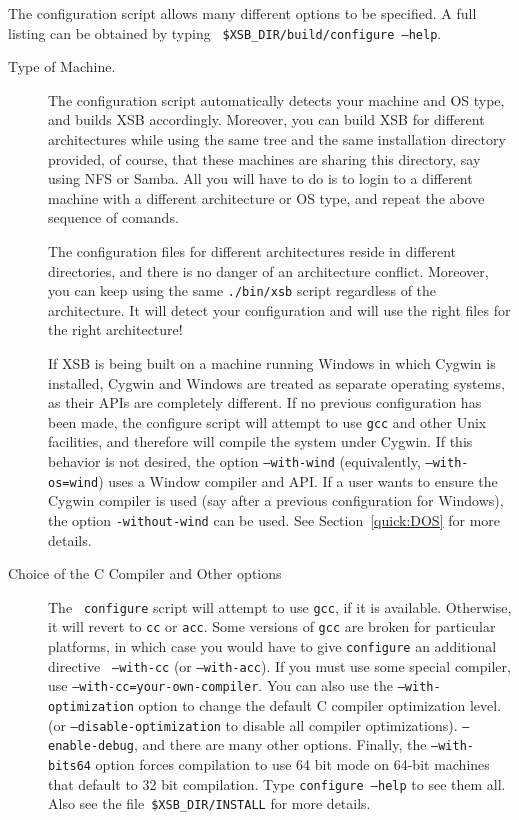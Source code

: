The configuration script allows many different options to be
specified.  A full listing can be obtained by typing {\tt
\$XSB\_DIR/build/configure --help}.
\begin{description}
\item[Type of Machine.]  The configuration script automatically detects
  your machine and OS type, and builds XSB accordingly. Moreover, you can
  build XSB for different architectures while using the same tree and the
  same installation directory provided, of course, that these machines are
  sharing this directory, say using NFS or Samba. All you will have to do
  is to login to a different machine with a different architecture or OS
  type, and repeat the above sequence of comands.
  
  The configuration files for different architectures reside in different
  directories, and there is no danger of an architecture conflict.
  Moreover, you can keep using the same {\tt ./bin/xsb} script regardless
  of the architecture. It will detect your configuration and will use the
  right files for the right architecture! 

  If XSB is being built on a machine running Windows in which Cygwin
  is installed, Cygwin and Windows are treated as separate operating
  systems, as their APIs are completely different.  If no previous
  configuration has been made, the configure script will attempt to
  use {\tt gcc} and other Unix facilities, and therefore will compile
  the system under Cygwin.  If this behavior is not desired, the
  option {\tt --with-wind} (equivalently, {\tt --with-os=wind}) uses a
  Window compiler and API.  If a user wants to ensure the Cygwin
  compiler is used (say after a previous configuration for Windows),
  the option {\tt -without-wind} can be used.  See
  Section~\ref{quick:DOS} for more details.

    
\item[Choice of the C Compiler and Other options] \label{cc} The {\tt
  configure} script will attempt to use {\tt gcc}, if it is available.
  Otherwise, it will revert to {\tt cc} or {\tt acc}.  Some versions
  of {\tt gcc} are broken for particular platforms, in which case you
  would have to give {\tt configure} an additional directive {\tt
    --with-cc} (or {\tt --with-acc}).  If you must use some special
  compiler, use {\tt --with-cc=your-own-compiler}.  You can also use
  the {\tt --with-optimization} option to change the default C
  compiler optimization level.  (or {\tt --disable-optimization} to
  disable all compiler optimizations).  {\tt --enable-debug}, and
  there are many other options.  Finally, the {\tt --with-bits64} option
  forces compilation to use 64 bit mode on 64-bit machines that
  default to 32 bit compilation.  Type {\tt configure --help} to see
  them all. Also see the file~\verb'$XSB_DIR/INSTALL' for more
  details.


\end{description}
